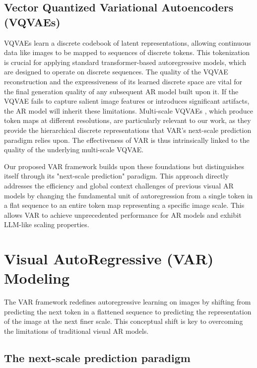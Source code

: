 \documentclass{article}
\begin{document}
\subsection{Vector Quantized Variational Autoencoders (VQVAEs)}
VQVAEs \cite{van2017neural} learn a discrete codebook of latent representations, allowing continuous data like images to be mapped to sequences of discrete tokens. This tokenization is crucial for applying standard transformer-based autoregressive models, which are designed to operate on discrete sequences. The quality of the VQVAE reconstruction and the expressiveness of its learned discrete space are vital for the final generation quality of any subsequent AR model built upon it. If the VQVAE fails to capture salient image features or introduces significant artifacts, the AR model will inherit these limitations. Multi-scale VQVAEs \cite{razavi2019generating}, which produce token maps at different resolutions, are particularly relevant to our work, as they provide the hierarchical discrete representations that VAR's next-scale prediction paradigm relies upon. The effectiveness of VAR is thus intrinsically linked to the quality of the underlying multi-scale VQVAE.

Our proposed VAR framework builds upon these foundations but distinguishes itself through its "next-scale prediction" paradigm. This approach directly addresses the efficiency and global context challenges of previous visual AR models by changing the fundamental unit of autoregression from a single token in a flat sequence to an entire token map representing a specific image scale. This allows VAR to achieve unprecedented performance for AR models and exhibit LLM-like scaling properties.

\section{Visual AutoRegressive (VAR) Modeling}
\label{sec:var_modeling}

The VAR framework redefines autoregressive learning on images by shifting from predicting the next token in a flattened sequence to predicting the representation of the image at the next finer scale. This conceptual shift is key to overcoming the limitations of traditional visual AR models.

\subsection{The next-scale prediction paradigm}
\label{ssec:next_scale_prediction}
\end{document}
